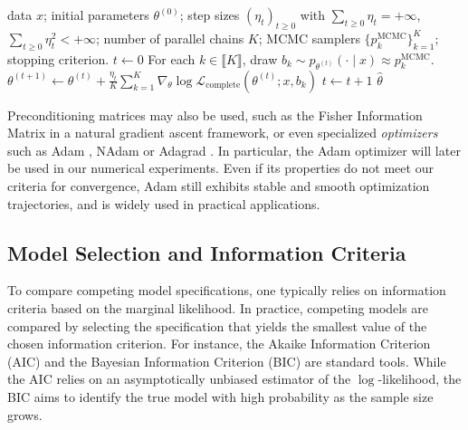 \documentclass{sn-jnl}
\begin{document}
\begin{algorithm}[H]
    \caption{Stochastic gradient ascent model inference}
    \label{alg:sgd}

    \begin{algorithmic}[1]
        \algrenewcommand{}
        \Require data $x$; initial parameters $\theta^{(0)}$; step sizes $(\eta_t)_{t \geq 0}$ with $\sum_{t \geq 0} \eta_t = +\infty$, $\sum_{t \geq 0} \eta_t^2 < +\infty$; number of parallel chains $K$; MCMC samplers $\{ p_k^{\mathrm{MCMC}} \}_{k=1}^K$; stopping criterion.
        \Statex
        \State $t \gets 0$
        \State For each $k \in \llbracket K \rrbracket$, draw $b_k \sim p_{\theta^{(t)}}(\cdot \mid x) \approx p_k^\mathrm{MCMC}$.
        \State $\theta^{(t+1)} \gets \theta^{(t)} + \frac{\eta_t}{K} \sum_{k=1}^K \nabla_\theta \log \mathcal{L}_\mathrm{complete} (\theta^{(t)} ; x, b_k)$
        \State $t \gets t + 1$
        \EndWhile
        \State \Return $\hat{\theta}$
    \end{algorithmic}
\end{algorithm}

Preconditioning matrices may also be used, such as the Fisher Information Matrix in a natural gradient ascent framework, or even specialized \emph{optimizers} such as Adam \citep{kingma2014adam}, NAdam \citep{dozat2016incorporating} or Adagrad \citep{duchi2011adaptive}. In particular, the Adam optimizer will later be used in our numerical experiments. Even if its properties do not meet our criteria for convergence, Adam still exhibits stable and smooth optimization trajectories, and is widely used in practical applications.

\subsection{Model Selection and Information Criteria} \label{subsec:criteria}

To compare competing model specifications, one typically relies on information criteria based on the marginal likelihood. In practice, competing models are compared by selecting the specification that yields the smallest value of the chosen information criterion. For instance, the Akaike Information Criterion (AIC) \citep{akaike2003new} and the Bayesian Information Criterion (BIC) \citep{schwarz1978estimating} are standard tools. While the AIC relies on an asymptotically unbiased estimator of the $\log$-likelihood, the BIC aims to identify the true model with high probability as the sample size grows.
\end{document}
